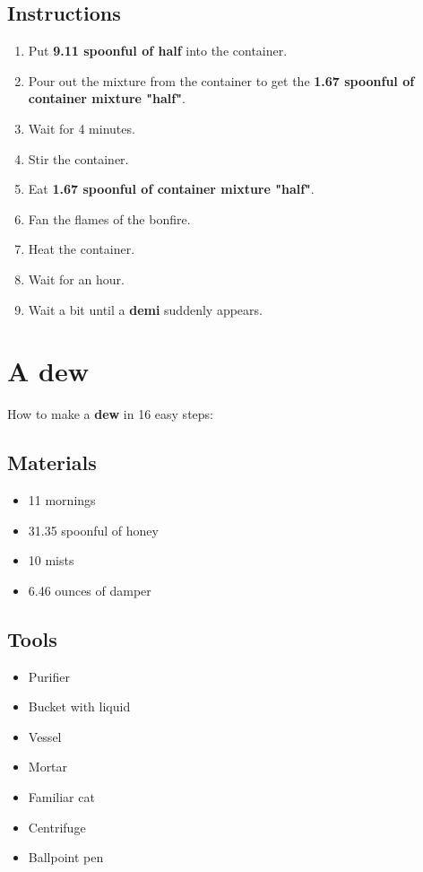 \documentclass{article}
\begin{document}
\subsection{Instructions}\begin{enumerate}
\item 
Put \textbf{9.11 spoonful of half} into the container.
\item 
Pour out the mixture from the container to get the \textbf{1.67 spoonful of container mixture "half"}.
\item 
Wait for 4 minutes.
\item 
Stir the container.
\item 
Eat \textbf{1.67 spoonful of container mixture "half"}.
\item 
Fan the flames of the bonfire.
\item 
Heat the container.
\item 
Wait for an hour.
\item 
Wait a bit until a \textbf{demi} suddenly appears.
\end{enumerate}
\newpage
\section{A dew}How to make a \textbf{dew} in 16 easy steps:

\subsection{Materials}\begin{itemize}
\item 
11 mornings
\item 
31.35 spoonful of honey
\item 
10 mists
\item 
6.46 ounces of damper
\end{itemize}
\subsection{Tools}\begin{itemize}
\item 
Purifier
\item 
Bucket with liquid
\item 
Vessel
\item 
Mortar
\item 
Familiar cat
\item 
Centrifuge
\item 
Ballpoint pen
\end{itemize}
\end{document}
